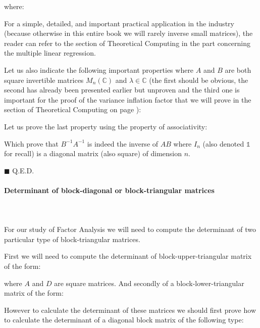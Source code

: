 	\begin{tcolorbox}[colframe=black,colback=white,sharp corners]
	where:
	
	\end{tcolorbox}
	
	For a simple, detailed, and important practical application in the industry (because otherwise in this entire book we will rarely inverse small matrices), the reader can refer to the section of Theoretical Computing in the part concerning the multiple linear regression.
	
	Let us also indicate the following important properties where $A$ and $B$ are both square invertible matrices $M_{n}(\mathbb{C})$ and $\lambda\in\mathbb{C}$ (the first should be obvious, the second has already been presented earlier but unproven and the third one is important for the proof of the variance inflation factor that we will prove in the section of Theoretical Computing on page \pageref{variance inflation factor}):
	
	Let us prove the last property using the property of associativity:
	\begin{dem}
	
	Which prove that $B^{-1}A^{-1}$ is indeed the inverse of $AB$ where $I_n$ (also denoted $\mathds{1}$ for recall) is a diagonal matrix (also square) of dimension $n$.
	\begin{flushright}
		$\blacksquare$  Q.E.D.
	\end{flushright}
	\end{dem}
	
	\paragraph{Determinant of block-diagonal or block-triangular matrices}\label{determinant of block-diagonal or block-triangular matrices}\mbox{}\\\\
	For our study of Factor Analysis we will need to compute the determinant of two particular type of block-triangular matrices.
	
	First we will need to compute the determinant of block-upper-triangular matrix of the form:
	
	where $A$ and $D$ are square matrices. And secondly of a block-lower-triangular matrix of the form:
	
	
	However to calculate the determinant of these matrices we should first prove how to calculate the determinant of a diagonal block matrix of the following type:
	
